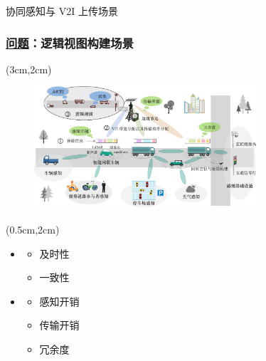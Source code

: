 \begin{frame}{协同感知与 V2I 上传场景}
\frametitle{\englishfont \underline{问题}：逻辑视图构建场景}
\newBackground
\begin{center}
\begin{textblock*}{\textwidth}(3cm,2cm)
\begin{figure}
\includegraphics[width=0.75\textwidth]{fig/Fig4-1-architerture.pdf}
\end{figure}
\end{textblock*}
\end{center}

\begin{center}
\begin{textblock*}{\textwidth}(0.5cm,2cm)
\begin{itemize}[itemsep=0.2\baselineskip] \englishfont
		\item[\ding{111}] {\color{cqublue}{视图质量}}
		\begin{itemize}[itemsep=0.2\baselineskip] \small
			\item[\ding{226}] 及时性
			\item[\ding{226}] 一致性
		\end{itemize}
		\item[\ding{111}] {\color{cqublue}{视图开销}}
		\begin{itemize}[itemsep=0.2\baselineskip] \small
			\item[\ding{226}] 感知开销
			\item[\ding{226}] 传输开销
			\item[\ding{226}] 冗余度
		\end{itemize}
\end{itemize}
\end{textblock*}
\end{center}
\end{frame}

